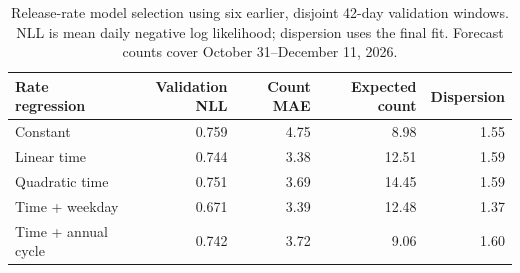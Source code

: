 \begin{table}[H]
\centering
\small
\caption{Release-rate model selection using six earlier, disjoint 42-day validation windows. NLL is mean daily negative log likelihood; dispersion uses the final fit. Forecast counts cover October 31--December 11, 2026.}\label{tab:release-rate}
\begin{tabular}{lrrrr}
\toprule
Rate regression & Validation NLL & Count MAE & Expected count & Dispersion \\
\midrule
Constant & 0.759 & 4.75 & 8.98 & 1.55 \\
Linear time & 0.744 & 3.38 & 12.51 & 1.59 \\
Quadratic time & 0.751 & 3.69 & 14.45 & 1.59 \\
Time + weekday & 0.671 & 3.39 & 12.48 & 1.37 \\
Time + annual cycle & 0.742 & 3.72 & 9.06 & 1.60 \\
\bottomrule
\end{tabular}
\end{table}
